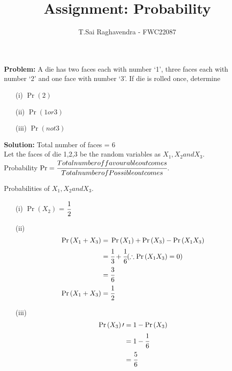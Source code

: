 \documentclass{article}
\providecommand{\pr}[1]{\ensuremath{\Pr\left(#1\right)}}
\newcommand{\Problem}{\noindent \textbf{Problem: }}
\newcommand{\solution}{\noindent \textbf{Solution: }}
\begin{document}
\title{Assignment: Probability}
\author{\Large T.Sai Raghavendra - FWC22087}
\date{}


\maketitle

\Problem A die has two faces each with number ‘1’, three faces each with number ‘2’ and
one face with number ‘3’. If die is rolled once, determine
\begin{enumerate}
\item[(i)] \pr{2}
\item[(ii)] \pr{1 or 3}
\item[(iii)] \pr{not 3}
\end{enumerate}

\solution
Total number of faces = 6\\
Let the faces of die 1,2,3 be the random variables as $X_1,X_2 and X_3$.\\
Probability $\Pr = \cfrac{Total number of favourable outcomes}{Total number of Possible outcomes}$.

	\begin{table}[h!]
	\small
	\centering
	
	\caption{Probabilities of $X_1,X_2 and X_3$.}
	\label{tables:table1}
	\end{table}

\begin{enumerate}
\item[(i)] \pr{X_2} = $\cfrac{1}{2}$\\  %
	
\item[(ii)] \begin{align}
\pr{X_1 + X_3}	=& \; \pr{X_1} + \pr{X_3} - \pr{X_1X_3}\\
				=& \; \cfrac{1}{3} + \cfrac{1}{6}   (\therefore \pr{X_1X_3} = 0)\\
				=& \; \cfrac{3}{6}\\
\pr{X_1 + X_3} 	=& \; \cfrac{1}{2}
\end{align}

\item[(iii)] \begin{align}
\pr{X_3}\prime =& \; 1 - \pr{X_3}\\
			   =& \; 1 - \cfrac{1}{6}\\
			   =& \; \cfrac{5}{6}
\end{align}
\end{enumerate}
\end{document}
